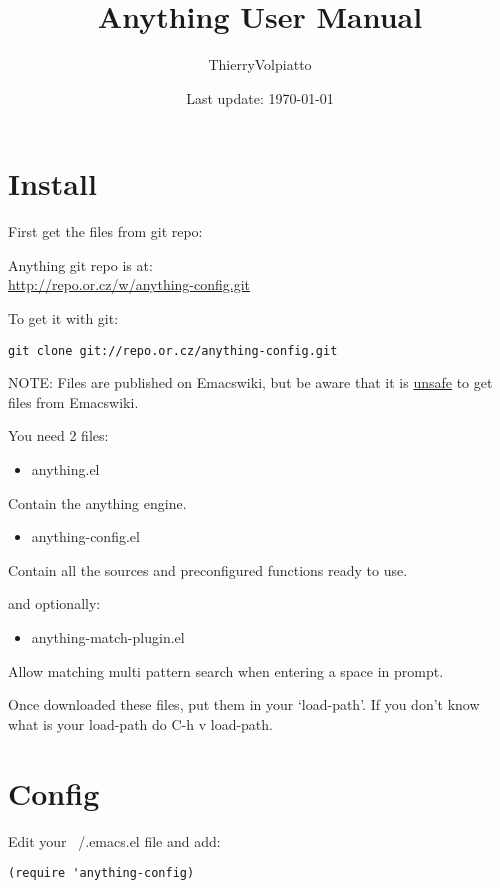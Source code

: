 \documentclass[a4paper,11pt]{article}
\begin{document}
\begin{titlepage}
\title{Anything User Manual}
\date{Last update: \today}
\author{ThierryVolpiatto}
\maketitle
\tableofcontents
\end{titlepage}

\section{Install}
\label{sec:install}

First get the files from git repo:

Anything git repo is at:\\
\url{http://repo.or.cz/w/anything-config.git}

To get it with git:

\begin{verbatim}
git clone git://repo.or.cz/anything-config.git
\end{verbatim}

NOTE: Files are published on Emacswiki, but be aware that it is \underline{unsafe} to get files from Emacswiki.
          
You need 2 files:
\begin{itemize}
\item anything.el
\end{itemize}
Contain the anything engine.

\begin{itemize}
\item anything-config.el
\end{itemize}
Contain all the sources and preconfigured functions ready to use.

and optionally:
\begin{itemize}
\item anything-match-plugin.el
\end{itemize}
Allow matching multi pattern search when entering a space in prompt.

Once downloaded these files, put them in your `load-path'.
If you don't know what is your load-path do C-h v load-path.

\section{Config}
\label{sec:config}
Edit your ~/.emacs.el file and add:

\begin{verbatim}
(require 'anything-config)
\end{verbatim}
\end{document}
